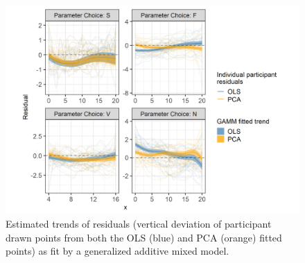 \documentclass[10pt]{article}
\begin{document}
\begin{figure}[ht]
\begin{center}
\centerline{\includegraphics[width=\columnwidth]{images/eyefitting-gamm-plot}}
\caption{Estimated trends of residuals (vertical deviation of participant drawn points from both the OLS (blue) and PCA (orange) fitted points) as fit by a generalized additive mixed model.}
\label{eyefitting-gamm-plot}
\end{center}
\end{figure}
\end{document}
